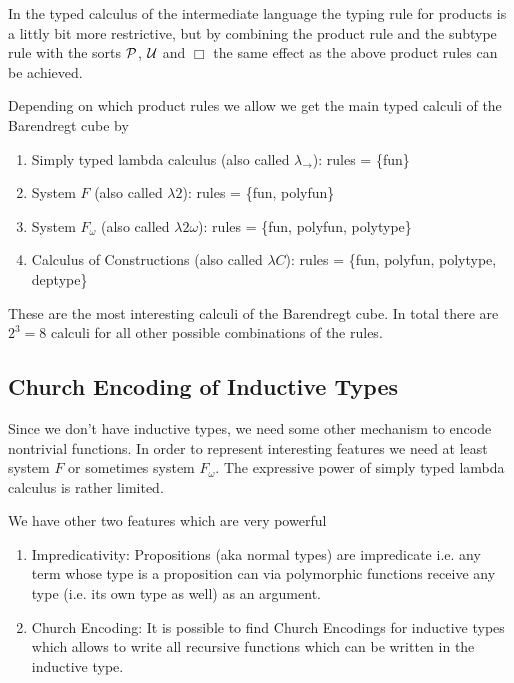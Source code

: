 In the typed calculus of the intermediate language the typing rule for
products is a littly bit more restrictive, but by combining the product rule
and the subtype rule with the sorts ${\cal{P}}$, ${\cal{U}}$ and $\Box$ the same effect
as the above product rules can be achieved.

Depending on which product rules we allow we get the main typed calculi of the
Barendregt cube by
\begin{enumerate}
\item Simply typed lambda calculus (also called $\lambda_\to$): rules =
  \{fun\}

\item System $F$ (also called $\lambda 2$): rules = \{fun, polyfun\}

\item System $F_\omega$ (also called $\lambda 2\omega$): rules = \{fun,
  polyfun, polytype\}

\item Calculus of Constructions (also called $\lambda C$): rules = \{fun,
  polyfun, polytype, deptype\}
\end{enumerate}

These are the most interesting calculi of the Barendregt cube. In total there
are $2^3 = 8$ calculi for all other possible combinations of the rules.





\subsection{Church Encoding of Inductive Types}

Since we don't have inductive types, we need some other mechanism to encode
nontrivial functions. In order to represent interesting features we need at
least system $F$ or sometimes system $F_\omega$. The expressive power of
simply typed lambda calculus is rather limited.

We have other two features which are very powerful
\begin{enumerate}
\item Impredicativity: Propositions (aka normal types) are impredicate
  i.e. any term whose type is a proposition can via polymorphic functions
  receive any type (i.e. its own type as well) as an argument.

\item Church Encoding: It is possible to find Church Encodings for inductive
  types which allows to write all recursive functions which can be written in
  the inductive type.
\end{enumerate}

